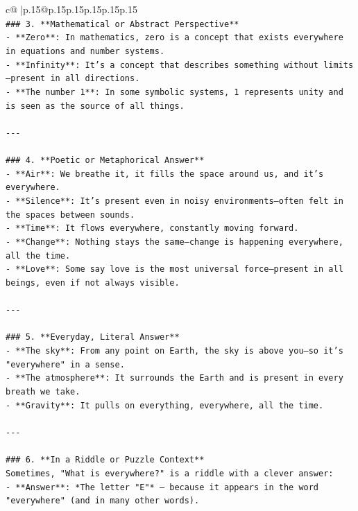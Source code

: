 \documentclass{article}
\begin{document}
{\begin{supertabular}{c@{$\;$}|p{.15\linewidth}@{}p{.15\linewidth}p{.15\linewidth}p{.15\linewidth}p{.15\linewidth}p{.15\linewidth}}
{{{\\ 
\texttt{\#\#\# 3. **Mathematical or Abstract Perspective**} \\
\texttt{{-} **Zero**: In mathematics, zero is a concept that exists everywhere in equations and number systems.} \\
\texttt{{-} **Infinity**: It’s a concept that describes something without limits—present in all directions.} \\
\texttt{{-} **The number 1**: In some symbolic systems, 1 represents unity and is seen as the source of all things.} \\
\\ 
\texttt{{-}{-}{-}} \\
\\ 
\texttt{\#\#\# 4. **Poetic or Metaphorical Answer**} \\
\texttt{{-} **Air**: We breathe it, it fills the space around us, and it’s everywhere.} \\
\texttt{{-} **Silence**: It’s present even in noisy environments—often felt in the spaces between sounds.} \\
\texttt{{-} **Time**: It flows everywhere, constantly moving forward.} \\
\texttt{{-} **Change**: Nothing stays the same—change is happening everywhere, all the time.} \\
\texttt{{-} **Love**: Some say love is the most universal force—present in all beings, even if not always visible.} \\
\\ 
\texttt{{-}{-}{-}} \\
\\ 
\texttt{\#\#\# 5. **Everyday, Literal Answer**} \\
\texttt{{-} **The sky**: From any point on Earth, the sky is above you—so it’s "everywhere" in a sense.} \\
\texttt{{-} **The atmosphere**: It surrounds the Earth and is present in every breath we take.} \\
\texttt{{-} **Gravity**: It pulls on everything, everywhere, all the time.} \\
\\ 
\texttt{{-}{-}{-}} \\
\\ 
\texttt{\#\#\# 6. **In a Riddle or Puzzle Context**} \\
\texttt{Sometimes, "What is everywhere?" is a riddle with a clever answer:} \\
\texttt{{-} **Answer**: *The letter "E"* — because it appears in the word "everywhere" (and in many other words).} \\
}}}
\end{supertabular}}
\end{document}
